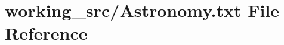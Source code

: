 \hypertarget{_astronomy_8txt}{}\section{working\+\_\+src/\+Astronomy.txt File Reference}
\label{_astronomy_8txt}
